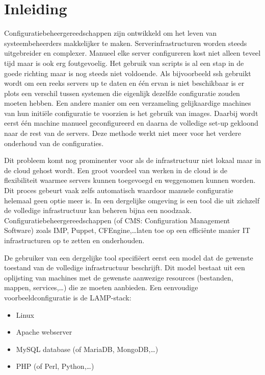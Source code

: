 \chapter{Inleiding}
\label{inleiding}
Configuratiebeheergereedschappen zijn ontwikkeld om het leven van systeembeheerders makkelijker te maken.
Serverinfrastructuren worden steeds uitgebreider en complexer.
Manueel elke server configureren kost niet alleen teveel tijd maar is ook erg foutgevoelig.
Het gebruik van scripts is al een stap in de goede richting maar is nog steeds niet voldoende.
Als bijvoorbeeld ssh gebruikt wordt om een reeks servers up te daten en \'e\'en ervan is niet beschikbaar is er plots een verschil tussen systemen die eigenlijk dezelfde configuratie zouden moeten hebben.
Een andere manier om een verzameling gelijkaardige machines van hun initi\"ele configuratie te voorzien is het gebruik van images.
Daarbij wordt eerst \'e\'en machine manueel geconfigureerd en daarna de volledige set-up gekloond naar de rest van de servers.
Deze methode werkt niet meer voor het verdere onderhoud van de configuraties.

Dit probleem komt nog prominenter voor als de infrastructuur niet lokaal maar in de cloud gehost wordt.
Een groot voordeel van werken in de cloud is de flexibiliteit waarmee servers kunnen toegevoegd en weggenomen kunnen worden.
Dit proces gebeurt vaak zelfs automatisch waardoor manuele configuratie helemaal geen optie meer is.
In een dergelijke omgeving is een tool die uit zichzelf de volledige infrastructuur kan beheren bijna een noodzaak.
Configuratiebeheergereedschappen (of CMS: Configuration Management Software) zoals IMP, Puppet, CFEngine,\ldots laten toe op een effici\"ente manier IT infrastructuren op te zetten en onderhouden.

De gebruiker van een dergelijke tool specifi\"eert eerst een model dat de gewenste toestand van de volledige infrastructuur beschrijft.
Dit model bestaat uit een oplijsting van machines met de gewenste aanwezige resources (bestanden, mappen, services,\ldots) die ze moeten aanbieden.
Een eenvoudige voorbeeldconfiguratie is de LAMP-stack: 
\begin{itemize}
  \item Linux
  \item Apache webserver
  \item MySQL database (of MariaDB, MongoDB,\ldots)
  \item PHP (of Perl, Python,\ldots)
\end{itemize}

